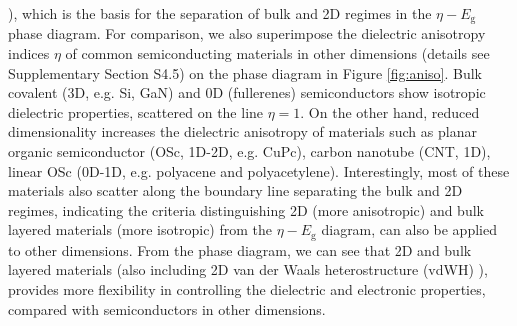 \documentclass[journal=ancac3,manuscript=article,email=true,hyperref=true,keywords=false]{achemso}
\begin{document}
), which is the basis for the separation of bulk and 2D
regimes in the $\eta-E_{\mathrm{g}}$ phase diagram.  For comparison,
we also superimpose the dielectric anisotropy indices $\eta$ of common
semiconducting materials in other dimensions (details see
Supplementary Section S4.5) on the phase diagram in Figure
\ref{fig:aniso}. Bulk covalent (3D, e.g. Si, GaN) and 0D (fullerenes)
semiconductors show isotropic dielectric properties, scattered on the
line $\eta=1$. On the other hand, reduced dimensionality increases the
dielectric anisotropy of materials such as planar organic
semiconductor (OSc, 1D-2D, e.g. CuPc), carbon nanotube (CNT, 1D),
linear OSc (0D-1D, e.g. polyacene and polyacetylene). Interestingly,
most of these materials also scatter along the boundary line
separating the bulk and 2D regimes, indicating the criteria
distinguishing 2D (more anisotropic) and bulk layered materials (more
isotropic) from the $\eta-E_{\mathrm{g}}$ diagram, can also be applied
to other dimensions. From the phase diagram, we can see that 2D and
bulk layered materials (also including 2D van der Waals
heterostructure (vdWH) \cite{Novoselov_2016}), provides more
flexibility in controlling the dielectric and electronic properties,
compared with semiconductors in other dimensions.  
\end{document}
